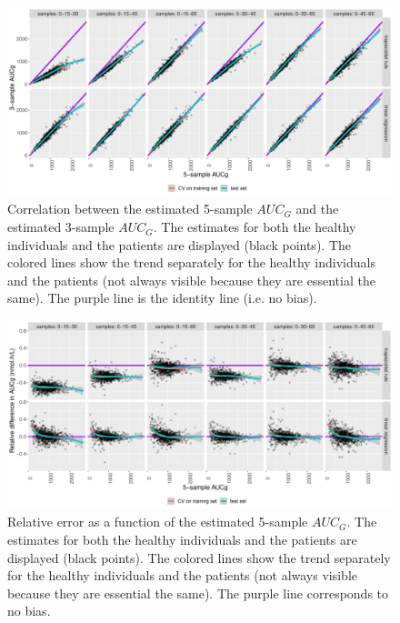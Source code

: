 \documentclass[12pt]{article}
\begin{document}
\begin{figure}[!h]
\centering
\includegraphics[width=1\textwidth]{./figures/AUCg-perf-cor.pdf}
\caption{\label{fig:AUCg-cor-estimator}Correlation between the estimated 5-sample \(AUC_G\) and the estimated 3-sample \(AUC_G\). The estimates for both the healthy individuals and the patients are displayed (black points). The colored lines show the trend separately for the healthy individuals and the patients (not always visible because they are essential the same). The purple line is the identity line (i.e. no bias).}
\end{figure}

\begin{figure}[!h]
\centering
\includegraphics[width=1\textwidth]{./figures/AUCg-perf-blandRelative.pdf}
\caption{\label{fig:AUCg-bland-estimator}Relative error as a function of the estimated 5-sample \(AUC_G\). The estimates for both the healthy individuals and the patients are displayed (black points). The colored lines show the trend separately for the healthy individuals and the patients (not always visible because they are essential the same). The purple line corresponds to no bias.}
\end{figure}

\clearpage
\end{document}
